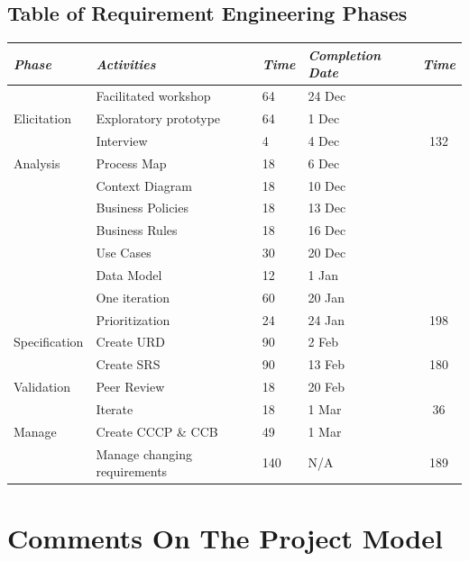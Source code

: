 \documentclass[a4paper]{article}
\begin{document}
\subsection{Table of Requirement Engineering Phases}
\begin{table}[H]
	\centering
	\begin{tabular}{|p{2cm}| p{4cm} |l | p{2cm}| c|}
	\hline
		\textit{Phase} & \textit{Activities} &  \textit{Time} & \textit{Completion Date} & \textit{Time} \\
	\hline
		 		  & Facilitated workshop & 64& 24 Dec & \\ \cline{2-4}
		Elicitation & Exploratory prototype & 64&  1 Dec & \\ \cline{2-4}
				  & Interview & 4& 4 Dec &132\\ \cline{2-4} 
				  \hline
		Analysis & Process Map & 18& 6 Dec &\\ \cline{2-4}
				 & Context Diagram & 18& 10 Dec &\\ \cline{2-4}
				 & Business Policies & 18& 13 Dec &\\ \cline{2-4}
				 & Business Rules & 18& 16 Dec &\\ \cline{2-4}
				 & Use Cases & 30& 20 Dec &\\ \cline{2-4}
				 & Data Model & 12& 1 Jan &\\ \cline{2-4}
				 & One iteration  & 60& 20 Jan &\\ \cline{2-4}
				 & Prioritization & 24& 24 Jan & 198\\ \cline{2-4} 
				 \hline
		Specification & Create URD & 90& 2 Feb &\\ \cline{2-4}
				 & Create SRS & 90& 13 Feb &180\\ \cline{2-4}
				 \hline
		Validation & Peer Review& 18& 20 Feb &\\ \cline{2-4}
				 & Iterate & 18& 1 Mar &36\\ \cline{2-4}
				 \hline
		Manage & Create CCCP \& CCB & 49& 1 Mar &\\ \cline{2-4}
				 & Manage changing requirements & 140& N/A &189\\ \cline{2-4} 
		\hline
	
	\end{tabular}
\end{table}

\section{Comments On The Project Model} 
\label{sec:comments_on_the_project_model}
\end{document}
